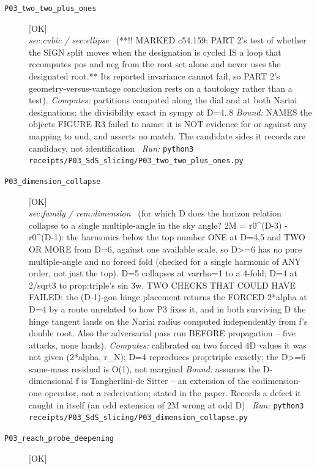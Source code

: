 \begin{description}
\item[\label{rcpt:P03_two_two_plus_ones}\texttt{P03\_two\_two\_plus\_ones}]\hfill\textsf{[OK]}\\
\textit{sec:cubic / sec:ellipse} \ (**!! MARKED c54.159: PART 2's test of whether the SIGN split moves when the designation is cycled IS a loop that recomputes pos and neg from the root set alone and never uses the designated root.** Its reported invariance cannot fail, so PART 2's geometry-versus-vantage conclusion rests on a tautology rather than a test). 
\emph{Computes:} partitions computed along the dial and at both Nariai designations; the divisibility exact in sympy at D=4..8
 \emph{Bound:} NAMES the objects FIGURE R3 failed to name; it is NOT evidence for or against any mapping to uud, and asserts no match. The candidate sides it records are candidacy, not identification
\ \emph{Run:} \texttt{python3 receipts/P03\_SdS\_slicing/P03\_two\_two\_plus\_ones.py}
\item[\label{rcpt:P03_dimension_collapse}\texttt{P03\_dimension\_collapse}]\hfill\textsf{[OK]}\\
\textit{sec:family / rem:dimension} \ (for which D does the horizon relation collapse to a single multiple-angle in the sky angle? 2M = r0\textasciicircum{}(D-3) - r0\textasciicircum{}(D-1): the harmonics below the top number ONE at D=4,5 and TWO OR MORE from D=6, against one available scale, so D>=6 has no pure multiple-angle and no forced fold (checked for a single harmonic of ANY order, not just the top). D=5 collapses at varrho=1 to a 4-fold; D=4 at 2/sqrt3 to prop:triple's sin 3w. TWO CHECKS THAT COULD HAVE FAILED: the (D-1)-gon hinge placement returns the FORCED 2*alpha at D=4 by a route unrelated to how P3 fixes it, and in both surviving D the hinge tangent lands on the Nariai radius computed independently from f's double root. Also the adversarial pass run BEFORE propagation -- five attacks, none lands). 
\emph{Computes:} calibrated on two forced 4D values it was not given (2*alpha, r\_N); D=4 reproduces prop:triple exactly; the D>=6 same-mass residual is O(1), not marginal
 \emph{Bound:} assumes the D-dimensional f is Tangherlini-de Sitter -- an extension of the codimension-one operator, not a rederivation; stated in the paper. Records a defect it caught in itself (an odd extension of 2M wrong at odd D)
\ \emph{Run:} \texttt{python3 receipts/P03\_SdS\_slicing/P03\_dimension\_collapse.py}
\item[\label{rcpt:P03_reach_probe_deepening}\texttt{P03\_reach\_probe\_deepening}]\hfill\textsf{[OK]}\\

\end{description}
